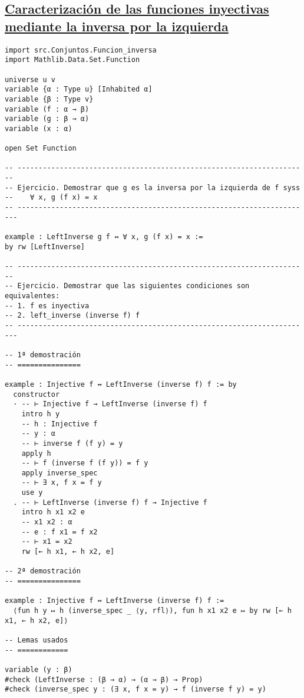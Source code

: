 \subsection{\href{./src/Conjuntos/Caracterizacion\_de\_las\_funciones\_inyectivas\_mediante\_la\_inversa\_por\_la\_izquierda.lean}{Caracterización de las funciones inyectivas mediante la inversa por la izquierda}}
\label{sec:orgdd49a39}
\begin{verbatim}
import src.Conjuntos.Funcion_inversa
import Mathlib.Data.Set.Function

universe u v
variable {α : Type u} [Inhabited α]
variable {β : Type v}
variable (f : α → β)
variable (g : β → α)
variable (x : α)

open Set Function

-- ---------------------------------------------------------------------
-- Ejercicio. Demostrar que g es la inversa por la izquierda de f syss
--    ∀ x, g (f x) = x
-- ----------------------------------------------------------------------

example : LeftInverse g f ↔ ∀ x, g (f x) = x :=
by rw [LeftInverse]

-- ---------------------------------------------------------------------
-- Ejercicio. Demostrar que las siguientes condiciones son equivalentes:
-- 1. f es inyectiva
-- 2. left_inverse (inverse f) f
-- ----------------------------------------------------------------------

-- 1ª demostración
-- ===============

example : Injective f ↔ LeftInverse (inverse f) f := by
  constructor
  · -- ⊢ Injective f → LeftInverse (inverse f) f
    intro h y
    -- h : Injective f
    -- y : α
    -- ⊢ inverse f (f y) = y
    apply h
    -- ⊢ f (inverse f (f y)) = f y
    apply inverse_spec
    -- ⊢ ∃ x, f x = f y
    use y
  . -- ⊢ LeftInverse (inverse f) f → Injective f
    intro h x1 x2 e
    -- x1 x2 : α
    -- e : f x1 = f x2
    -- ⊢ x1 = x2
    rw [← h x1, ← h x2, e]

-- 2ª demostración
-- ===============

example : Injective f ↔ LeftInverse (inverse f) f :=
  ⟨fun h y ↦ h (inverse_spec _ ⟨y, rfl⟩), fun h x1 x2 e ↦ by rw [← h x1, ← h x2, e]⟩

-- Lemas usados
-- ============

variable (y : β)
#check (LeftInverse : (β → α) → (α → β) → Prop)
#check (inverse_spec y : (∃ x, f x = y) → f (inverse f y) = y)
\end{verbatim}

